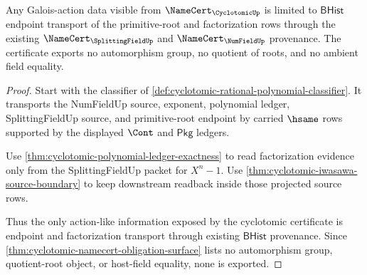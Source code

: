 \begin{theorem}
\label{thm:cyclotomic-galois-action-boundary}
Any Galois-action data visible from $\NameCert_{\CyclotomicUp}$ is limited to $\mathsf{BHist}$ endpoint transport of the primitive-root and factorization rows through the existing $\NameCert_{\SplittingFieldUp}$ and $\NameCert_{\NumFieldUp}$ provenance. The certificate exports no automorphism group, no quotient of roots, and no ambient field equality.
\end{theorem}
\begin{proof}
Start with the classifier of \autoref{def:cyclotomic-rational-polynomial-classifier}. It transports the NumFieldUp source, exponent, polynomial ledger, SplittingFieldUp source, and primitive-root endpoint by carried $\hsame$ rows supported by the displayed $\Cont$ and $\mathsf{Pkg}$ ledgers.

Use \autoref{thm:cyclotomic-polynomial-ledger-exactness} to read factorization evidence only from the SplittingFieldUp packet for $X^n-1$. Use \autoref{thm:cyclotomic-iwasawa-source-boundary} to keep downstream readback inside those projected source rows.

Thus the only action-like information exposed by the cyclotomic certificate is endpoint and factorization transport through existing $\mathsf{BHist}$ provenance. Since \autoref{thm:cyclotomic-namecert-obligation-surface} lists no automorphism group, quotient-root object, or host-field equality, none is exported.
\end{proof}

